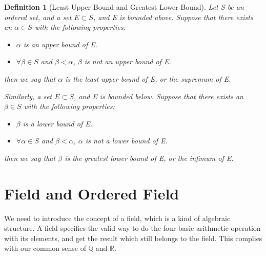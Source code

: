 \documentclass[onecolumn]{article}
\newtheorem{definition}{Definition}[section]
\begin{document}
\begin{definition}[Least Upper Bound and Greatest Lower Bound]
  Let S be an ordered set, and a set $E \subset S$, and E is bounded above. 
  Suppose that there exists an $\alpha \in S$ with the following properties:
  \begin{itemize}
    \item $\alpha$ is an upper bound of E.
    \item $\forall \beta \in S$ and $\beta < \alpha$, $\beta$ is not an upper 
    bound of E.
  \end{itemize}
  then we say that $\alpha$ is the least upper bound of E, or the supremum of E.
  
  Similarly, a set $E \subset S$, and E is bounded below. Suppose that there 
  exists an $\beta \in S$ with the following properties:
  \begin{itemize}
    \item $\beta$ is a lower bound of E.
    \item $\forall \alpha \in S$ and $\beta < \alpha$, $\alpha$ is not a lower 
    bound of E.
  \end{itemize}
  then we say that $\beta$ is the greatest lower bound of E, or the infimum of E.
\end{definition}

\section{Field and Ordered Field}

We need to introduce the concept of a field, which is a kind of algebraic 
structure. A field specifies the valid way to do the four basic arithmetic 
operation with its elements, and get the result which still belongs to the 
field. This complies with our common sense of $\mathbb{Q}$ and $\mathbb{R}$.
\end{document}
